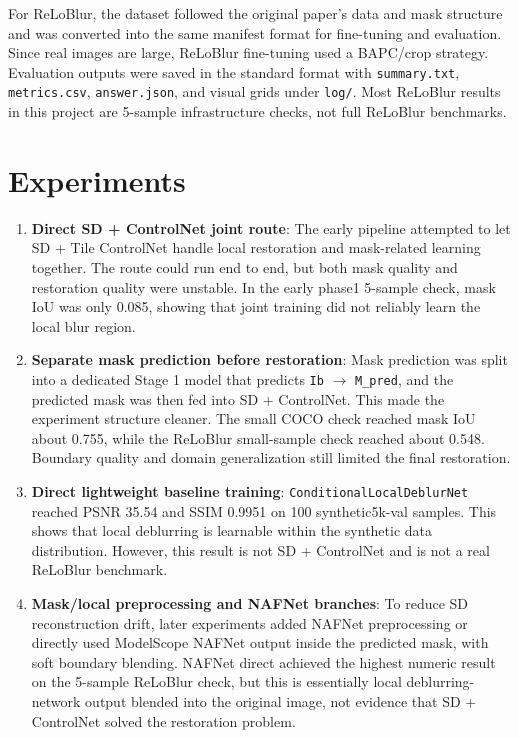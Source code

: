 \documentclass[11pt]{article}
\begin{document}
For ReLoBlur, the dataset followed the original paper's data and mask structure and was converted into the same manifest format for fine-tuning and evaluation.
Since real images are large, ReLoBlur fine-tuning used a BAPC/crop strategy.
Evaluation outputs were saved in the standard format with \texttt{summary.txt}, \texttt{metrics.csv}, \texttt{answer.json}, and visual grids under \texttt{log/}.
Most ReLoBlur results in this project are 5-sample infrastructure checks, not full ReLoBlur benchmarks.

\section{Experiments}

\begin{enumerate}[label=\arabic*., leftmargin=*]
  \item \textbf{Direct SD + ControlNet joint route}: The early pipeline attempted to let SD + Tile ControlNet handle local restoration and mask-related learning together.
    The route could run end to end, but both mask quality and restoration quality were unstable.
    In the early phase1 5-sample check, mask IoU was only 0.085, showing that joint training did not reliably learn the local blur region.

  \item \textbf{Separate mask prediction before restoration}: Mask prediction was split into a dedicated Stage 1 model that predicts \texttt{Ib} \(\rightarrow\) \texttt{M\_pred}, and the predicted mask was then fed into SD + ControlNet.
    This made the experiment structure cleaner.
    The small COCO check reached mask IoU about 0.755, while the ReLoBlur small-sample check reached about 0.548.
    Boundary quality and domain generalization still limited the final restoration.

  \item \textbf{Direct lightweight baseline training}: \texttt{ConditionalLocalDeblurNet} reached PSNR 35.54 and SSIM 0.9951 on 100 synthetic5k-val samples.
    This shows that local deblurring is learnable within the synthetic data distribution.
    However, this result is not SD + ControlNet and is not a real ReLoBlur benchmark.

  \item \textbf{Mask/local preprocessing and NAFNet branches}: To reduce SD reconstruction drift, later experiments added NAFNet preprocessing or directly used ModelScope NAFNet output inside the predicted mask, with soft boundary blending.
    NAFNet direct achieved the highest numeric result on the 5-sample ReLoBlur check, but this is essentially local deblurring-network output blended into the original image, not evidence that SD + ControlNet solved the restoration problem.


\end{enumerate}
\end{document}
